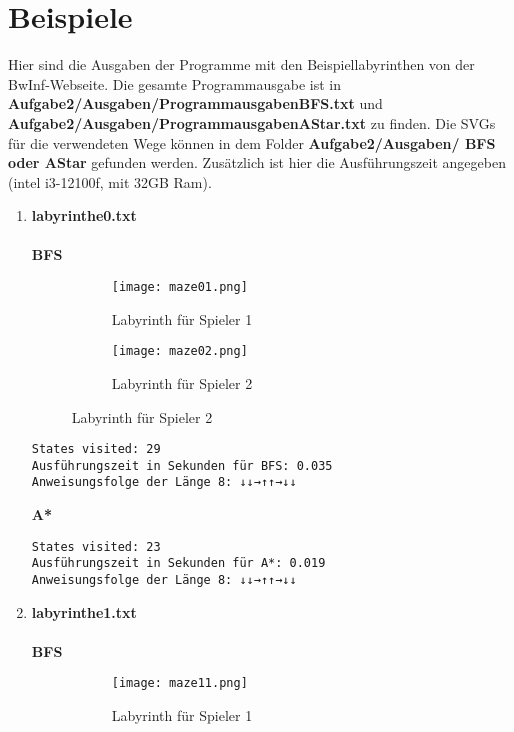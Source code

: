 \documentclass[a4paper,10pt,ngerman]{scrartcl}
\begin{document}
\section{Beispiele}
Hier sind die Ausgaben der Programme mit den Beispiellabyrinthen von der BwInf-Webseite. Die gesamte Programmausgabe ist in \textbf{Aufgabe2/Ausgaben/ProgrammausgabenBFS.txt} und \\ \textbf{Aufgabe2/Ausgaben/ProgrammausgabenAStar.txt} zu finden. Die SVGs für die verwendeten Wege können in dem Folder \textbf{Aufgabe2/Ausgaben/ BFS oder AStar} gefunden werden. Zusätzlich ist hier die Ausführungszeit angegeben (intel i3-12100f, mit 32GB Ram).

\begin{enumerate}
  \item \textbf{labyrinthe0.txt}\\
\\\textbf{BFS}
\begin{figure}[H]
    \centering
    \begin{subfigure}{0.45\textwidth}
        \centering
        \texttt{[image: maze01.png]} 
        \caption{Labyrinth für Spieler 1}
    \end{subfigure}
    \hfill
    \begin{subfigure}{0.45\textwidth}
        \centering
        \texttt{[image: maze02.png]}
        \caption{Labyrinth für Spieler 2}
    \end{subfigure}
\end{figure}
  \begin{verbatim}
States visited: 29
Ausführungszeit in Sekunden für BFS: 0.035
Anweisungsfolge der Länge 8: ↓↓→↑↑→↓↓
  \end{verbatim}
\textbf{A*}
\begin{verbatim}
States visited: 23
Ausführungszeit in Sekunden für A*: 0.019
Anweisungsfolge der Länge 8: ↓↓→↑↑→↓↓
\end{verbatim}
  \item \textbf{labyrinthe1.txt}\\
\\\textbf{BFS}
\begin{figure}[H]
    \centering
    \begin{subfigure}{0.45\textwidth}
        \centering
        \texttt{[image: maze11.png]} 
        \caption{Labyrinth für Spieler 1}
    \end{subfigure}
    \hfill
    \begin{subfigure}{0.45\textwidth}

\end{subfigure}
\end{figure}
\end{enumerate}
\end{document}
